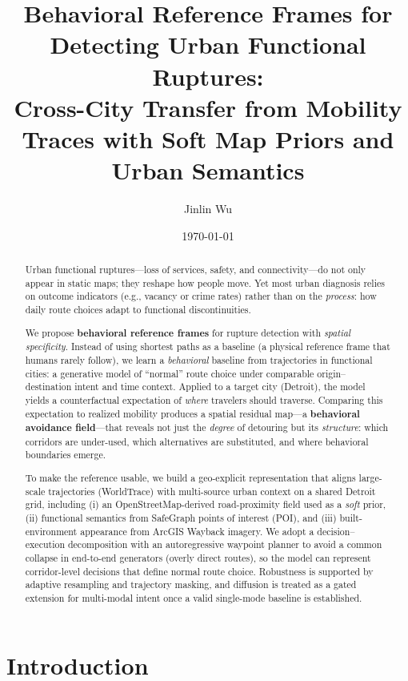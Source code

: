 \documentclass[12pt]{article}
\title{Behavioral Reference Frames for Detecting Urban Functional Ruptures:\\Cross-City Transfer from Mobility Traces with Soft Map Priors and Urban Semantics}
\author{Jinlin Wu}
\date{\today}
\begin{document}
\maketitle

\begin{abstract}
Urban functional ruptures---loss of services, safety, and connectivity---do not only appear in static maps; they reshape how people move. Yet most urban diagnosis relies on outcome indicators (e.g., vacancy or crime rates) rather than on the \emph{process}: how daily route choices adapt to functional discontinuities.

We propose \textbf{behavioral reference frames} for rupture detection with \emph{spatial specificity}. Instead of using shortest paths as a baseline (a physical reference frame that humans rarely follow), we learn a \emph{behavioral} baseline from trajectories in functional cities: a generative model of ``normal'' route choice under comparable origin--destination intent and time context. Applied to a target city (Detroit), the model yields a counterfactual expectation of \emph{where} travelers should traverse. Comparing this expectation to realized mobility produces a spatial residual map---a \textbf{behavioral avoidance field}---that reveals not just the \emph{degree} of detouring but its \emph{structure}: which corridors are under-used, which alternatives are substituted, and where behavioral boundaries emerge.

To make the reference usable, we build a geo-explicit representation that aligns large-scale trajectories (WorldTrace) with multi-source urban context on a shared Detroit grid, including (i) an OpenStreetMap-derived road-proximity field used as a \emph{soft} prior, (ii) functional semantics from SafeGraph points of interest (POI), and (iii) built-environment appearance from ArcGIS Wayback imagery. We adopt a decision--execution decomposition with an autoregressive waypoint planner to avoid a common collapse in end-to-end generators (overly direct routes), so the model can represent corridor-level decisions that define normal route choice. Robustness is supported by adaptive resampling and trajectory masking, and diffusion is treated as a gated extension for multi-modal intent once a valid single-mode baseline is established.
\end{abstract}

\section{Introduction}

\end{document}
